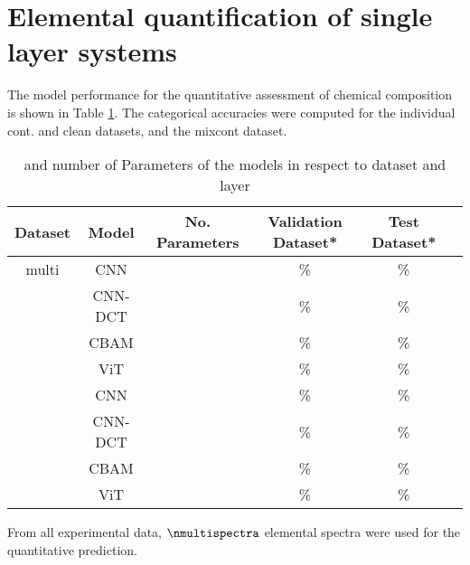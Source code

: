 \section{Elemental quantification of single layer systems}

The model performance for the quantitative assessment of chemical composition is shown in Table \ref{tab:acc_quant}. The categorical accuracies were computed for the individual cont. and clean datasets, and the mixcont dataset. 

\begin{table}[H]
    \centering
    \begin{tabular}{c|c|c|c|c|c}
        \hline
       Dataset & Model   & No. Parameters & Validation Dataset*  & Test Dataset*    \\
        \hline
        multi  & CNN     &                &        \%              &         \% \\
               & CNN-DCT &                &       \%              &          \% \\
               & CBAM    &                &       \%              &          \% \\
               & ViT     &                &       \%              &          \% \\
               & CNN     &                &       \%              &          \%  \\
               & CNN-DCT &                &       \%              &          \%  \\
               & CBAM    &                &       \%              &          \% \\
               & ViT     &                &       \%              &          \% \\
    \end{tabular}
    \caption{ and number of Parameters of the models in respect to dataset and layer}
    \label{tab:acc_quant}
\end{table}


From all experimental data, $\nmultispectra$ elemental spectra were used for the quantitative prediction. 

